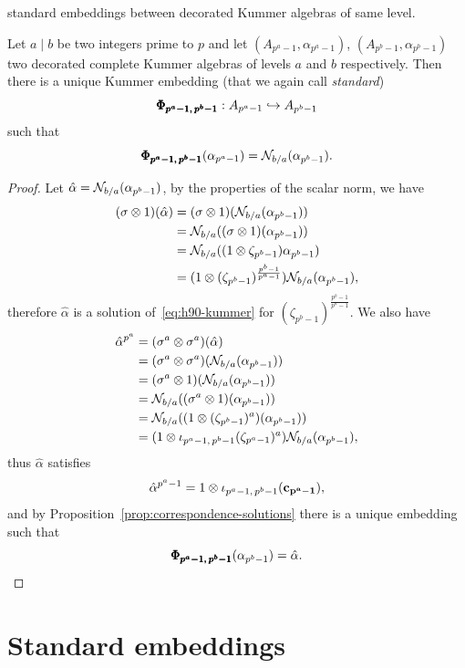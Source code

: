 standard embeddings between decorated Kummer algebras of same level.
\begin{prop}
  \label{prop:norm-compatibility}
  Let $a\mid b$ be two integers prime to $p$ and let $(A_{p^a-1},
  \alpha_{p^a-1})$, $(A_{p^b-1}, \alpha_{p^b-1})$ two decorated complete
  Kummer algebras of levels $a$ and $b$ respectively. Then there is a unique
  Kummer embedding (that we again call \emph{standard})
  \[
    \pmb{\Phi_{{p^a-1},\,{p^b-1}}}:A_{p^a-1}\hookrightarrow A_{p^b-1}
  \]
  such that
  \[
    \pmb{\Phi_{{p^a-1},\,{p^b-1}}}(\alpha_{p^a-1}) = \mathcal{N}_{b/a}(\alpha_{p^b-1}).
  \]
\end{prop}
\begin{proof}
  Let $\hat\alpha = \mathcal{N}_{b/a}(\alpha_{p^b-1})$, by the properties of the scalar
  norm, we have
  \begin{align*}
    (\sigma\otimes1)(\hat\alpha) &=
    (\sigma\otimes1)(\mathcal{N}_{b/a}(\alpha_{p^b-1}))\\
    &= \mathcal{N}_{b/a}( (\sigma\otimes1)(\alpha_{p^b-1}))\\
    &= \mathcal{N}_{b/a}( (1\otimes\zeta_{p^b-1})\alpha_{p^b-1})\\
    &= (1\otimes(\zeta_{p^b-1})^{\frac{p^b-1}{p^a-1}})\mathcal{N}_{b/a}(\alpha_{p^b-1}),
  \end{align*}
  therefore $\hat\alpha$ is a solution of~\eqref{eq:h90-kummer} for
  $(\zeta_{p^b-1})^{\frac{p^b-1}{p^a-1}}$.
  We also have 
  \begin{align*}
    \hat\alpha^{p^a} &= (\sigma^a\otimes\sigma^a)(\hat\alpha)\\
    &= (\sigma^a\otimes\sigma^a)(\mathcal{N}_{b/a}(\alpha_{p^b-1}))\\
    &= (\sigma^a\otimes1)(\mathcal{N}_{b/a}(\alpha_{p^b-1}))\\
    &= \mathcal{N}_{b/a}((\sigma^a\otimes1)(\alpha_{p^b-1}))\\
    &= \mathcal{N}_{b/a}((1\otimes(\zeta_{p^b-1})^a)(\alpha_{p^b-1}))\\
    &= (1\otimes\iota_{p^a-1,\,p^b-1}(\zeta_{p^a-1})^a)\mathcal{N}_{b/a}(\alpha_{p^b-1}),
  \end{align*}
  thus $\hat\alpha$ satisfies
  \[
    \hat\alpha^{p^a-1} = 1\otimes\iota_{p^a-1,\,p^b-1}(\mathbf{c_{p^a-1}}),
  \]
  and by Proposition~\ref{prop:correspondence-solutions} there is a unique
  embedding such that
  \[
    \pmb{\Phi_{{p^a-1},\,{p^b-1}}}(\alpha_{p^b-1}) = \hat\alpha.
  \]
\end{proof}

\section{Standard embeddings}
\label{sec:standard-embeddings}

